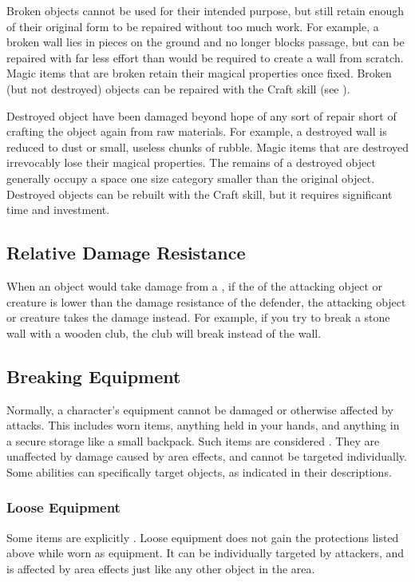         \label{Broken Objects}
        Broken objects cannot be used for their intended purpose, but still retain enough of their original form to be repaired without too much work.
        For example, a broken wall lies in pieces on the ground and no longer blocks passage, but can be repaired with far less effort than would be required to create a wall from scratch.
        Magic items that are broken retain their magical properties once fixed.
        Broken (but not destroyed) objects can be repaired with the Craft skill (see ).

        \label{Destroyed Objects}
        Destroyed object have been damaged beyond hope of any sort of repair short of crafting the object again from raw materials.
        For example, a destroyed wall is reduced to dust or small, useless chunks of rubble.
        Magic items that are destroyed irrevocably lose their magical properties.
        The remains of a destroyed object generally occupy a space one size category smaller than the original object.
        Destroyed objects can be rebuilt with the Craft skill, but it requires significant time and investment.

    \subsection{Relative Damage Resistance}\label{Relative Damage Resistance}
        When an object would take damage from a , if the  of the attacking object or creature is lower than the damage resistance of the defender, the attacking object or creature takes the damage instead.
        For example, if you try to break a stone wall with a wooden club, the club will break instead of the wall.

    \subsection{Breaking Equipment}\label{Breaking Equipment}
        Normally, a character's equipment cannot be damaged or otherwise affected by attacks.
        This includes worn items, anything held in your hands, and anything in a secure storage like a small backpack.
        Such items are considered .
        They are unaffected by damage caused by area effects, and cannot be targeted individually.
        Some abilities can specifically target  objects, as indicated in their descriptions.

        \subsubsection{Loose Equipment}
            Some items are explicitly .
            Loose equipment does not gain the protections listed above while worn as equipment.
            It can be individually targeted by attackers, and is affected by area effects just like any other object in the area.
